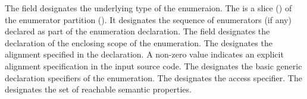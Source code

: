 The  field designates the underlying type of the enumeraion.
The  is a slice () of the enumerator partition (). 
 It designates the sequence of enumerators (if any) declared as part
of the enumeration declaration.
The  field designates the declaration of the enclosing scope of the enumeration.
The  designates the alignment specified in the declaration.  A non-zero value indicates an explicit alignment specification
in the input source code.
The  designates the basic generic declaration specifiers of the enumeration.
The  designates the access specifier.
The  designates the set of reachable semantic properties.


\subsection{} 
\label{sec:ifc:DeclSort:Alias}

